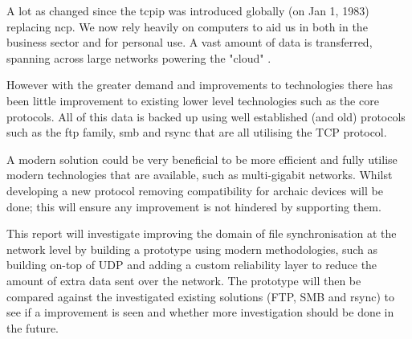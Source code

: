A lot as changed since the \acrfull{tcpip} was introduced globally (on Jan 1, 1983) replacing \acrfull{ncp}. We now rely heavily on computers to aid us in both in the business sector and for personal use. A vast amount of data is transferred, spanning across large networks powering the "cloud" \parencite{tcpip-transition}.

However with the greater demand and improvements to technologies there has been little improvement to existing lower level technologies such as the core protocols. All of this data is backed up using well established (and old) protocols such as the \acrfull{ftp} family, \acrfull{smb} and rsync that are all utilising the TCP protocol.

A modern solution could be very beneficial to be more efficient and fully utilise modern technologies that are available, such as multi-gigabit networks. Whilst developing a new protocol removing compatibility for archaic devices will be done; this will ensure any improvement is not hindered by supporting them.

This report will investigate improving the domain of file synchronisation at the network level by building a prototype using modern methodologies, such as building on-top of UDP and adding a custom reliability layer to reduce the amount of extra data sent over the network. The prototype will then be compared against the investigated existing solutions (FTP, SMB and rsync) to see if a improvement is seen and whether more investigation should be done in the future.
